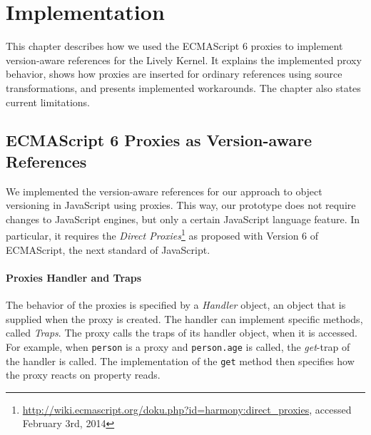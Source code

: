 \chapter{Implementation} \label{chapter:IMPLEMENTATION}

This chapter describes how we used the ECMAScript 6 proxies to implement version-aware references for the Lively Kernel.
It explains the implemented proxy behavior, shows how proxies are inserted for ordinary references using source transformations, and presents implemented workarounds.
The chapter also states current limitations.









\section{ECMAScript 6 Proxies as Version-aware References} \label{sec:IMPLEMENTATION:1}

We implemented the version-aware references for our approach to object versioning in JavaScript using proxies.
This way, our prototype does not require changes to JavaScript engines, but only a certain JavaScript language feature.
In particular, it requires the \emph{Direct Proxies}\footnote{\url{http://wiki.ecmascript.org/doku.php?id=harmony:direct_proxies}, accessed February 3rd, 2014} as proposed with Version 6 of ECMAScript, the next standard of JavaScript.

\subsubsection{Proxies Handler and Traps}

The behavior of the proxies is specified by a \emph{Handler} object, an object that is supplied when the proxy is created.
The handler can implement specific methods, called \emph{Traps}.
The proxy calls the traps of its handler object, when it is accessed.
For example, when \lstinline{person} is a proxy and \lstinline{person.age} is called, the \emph{get}-trap of the handler is called.
The implementation of the \lstinline{get} method then specifies how the proxy reacts on property reads.

